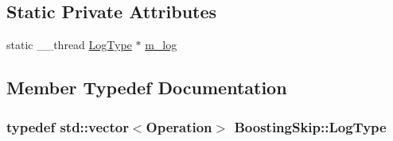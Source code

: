\subsection*{Static Private Attributes}
\begin{DoxyCompactItemize}
\item 
static \-\_\-\-\_\-thread \hyperlink{classBoostingSkip_adde173207d30984e65e1d63fa25df19e}{Log\-Type} $\ast$ \hyperlink{classBoostingSkip_a4a144bee7a632c2f4819fdd944273833}{m\-\_\-log}
\end{DoxyCompactItemize}


\subsection{Member Typedef Documentation}
\hypertarget{classBoostingSkip_adde173207d30984e65e1d63fa25df19e}{
\subsubsection[{Log\-Type}]{\setlength{\rightskip}{0pt plus 5cm}typedef std\-::vector$<${\bf Operation}$>$ {\bf Boosting\-Skip\-::\-Log\-Type}\hspace{0.3cm}{\ttfamily [private]}}}\label{classBoostingSkip_adde173207d30984e65e1d63fa25df19e}


